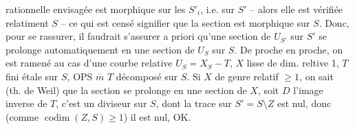 rationnelle envisagée est morphique sur
les $S'_i$, i.e. sur $S'$ -- alors elle est
vérifiée relatiment  $S$ -- ce qui
est censé signifier que la section est
morphique sur $S$. Donc, pour se
rassurer, il faudrait s'assurer a
priori qu'une section de $U_{S'}$ sur $S'$
se prolonge automatiquement en 
une section de $U_S$ sur $S$. De proche
en proche, on est ramené au cas
d'une courbe relative $U_S=X_S-T$,
$X$ lisse  de dim. reltive 1, $T$ fini étale
sur $S$,  OPS $\overline m$ $T$ décomposé sur $S$.
Si $X$ de genre relatif $\geq 1$, on sait
(th. de Weil) que la section se prolonge
en une section de $X$, soit $D$ l'image
inverse de $T$, c'est un diviseur sur $S$,
dont la trace sur $S'=S\setminus Z$ est nul, donc
(comme $\operatorname{codim}(Z,S)\geq 1$) il est nul, OK.
